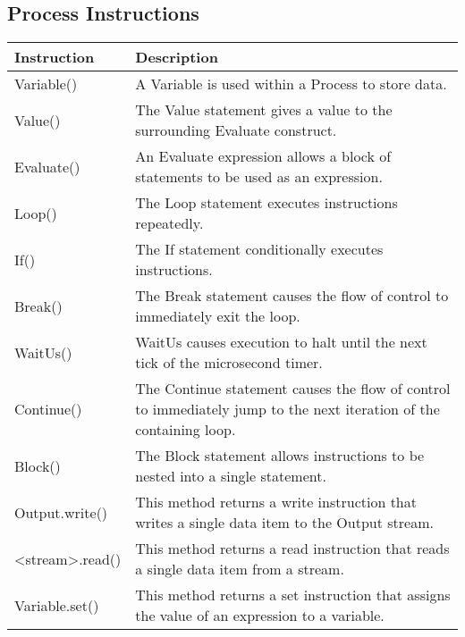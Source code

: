 \documentclass[letterpaper,10pt,english]{sphinxmanual}
\begin{document}
\subsection{Process Instructions}
\label{tutorial/index:process-instructions}
\begin{tabulary}{\linewidth}{|L|L|}
\hline
\textbf{
Instruction
} & \textbf{
Description
}\\
\hline

Variable()
 & 
A Variable is used within a Process to store data.
\\

Value()
 & 
The Value statement gives a value to the surrounding
Evaluate construct.
\\

Evaluate()
 & 
An Evaluate  expression allows a block of statements
to be used as an expression.
\\

Loop()
 & 
The Loop statement executes instructions repeatedly.
\\

If()
 & 
The If statement conditionally executes
instructions.
\\

Break()
 & 
The Break statement causes the flow of control to
immediately exit the loop.
\\

WaitUs()
 & 
WaitUs causes execution to halt until the next tick
of the microsecond timer.
\\

Continue()
 & 
The Continue statement causes the flow of control to
immediately jump to the next iteration of the
containing loop.
\\

Block()
 & 
The Block statement allows instructions to be nested
into a single statement.
\\

Output.write()
 & 
This method returns a write instruction that writes a
single data item to the Output stream.
\\

\textless{}stream\textgreater{}.read()
 & 
This method returns a read instruction that reads a
single data item from a  stream.
\\

Variable.set()
 & 
This method returns a set instruction that assigns the
value of an expression to a variable.
\\
\hline
\end{tabulary}
\end{document}
